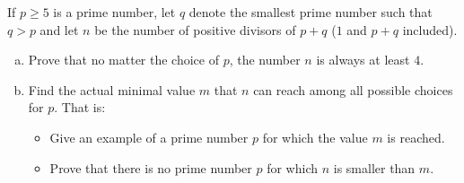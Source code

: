 If $p\geq 5$ is a prime number, let $q$ denote the smallest prime number such that
$q>p$ and let $n$ be the number of positive divisors of $p+q$ ($1$ and $p+q$ included).
\begin{enumerate}[a)]
    \item Prove that no matter the choice of $p$, the number $n$ is always at least $4$.
    \item Find the actual minimal value $m$ that $n$ can reach among all possible choices for $p$. That is:
    \begin{itemize}
        \item Give an example of a prime number $p$ for which the value $m$ is reached.
        \item Prove that there is no prime number $p$ for which $n$ is smaller than $m$.
    \end{itemize}
\end{enumerate}
